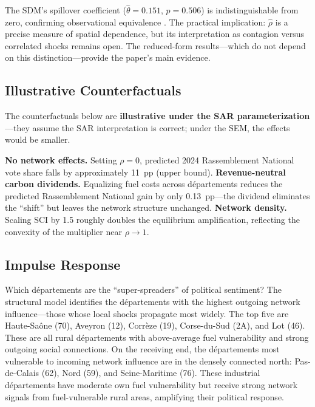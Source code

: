 \documentclass[12pt]{article}
\newcommand{\rn}{Rassemblement National}
\newcommand{\depts}{d\'{e}partements}
\begin{document}
The SDM's spillover coefficient ($\hat{\theta} = 0.151$, $p = 0.506$) is indistinguishable from zero, confirming observational equivalence \citep{lesage2009introduction}. The practical implication: $\hat{\rho}$ is a precise measure of spatial dependence, but its interpretation as contagion versus correlated shocks remains open. The reduced-form results---which do not depend on this distinction---provide the paper's main evidence.

\subsection{Illustrative Counterfactuals}

The counterfactuals below are \textbf{illustrative under the SAR parameterization}---they assume the SAR interpretation is correct; under the SEM, the effects would be smaller.

\textbf{No network effects.} Setting $\rho = 0$, predicted 2024 \rn{} vote share falls by approximately 11~pp (upper bound). \textbf{Revenue-neutral carbon dividends.} Equalizing fuel costs across \depts{} reduces the predicted \rn{} gain by only 0.13~pp---the dividend eliminates the ``shift'' but leaves the network structure unchanged. \textbf{Network density.} Scaling SCI by 1.5 roughly doubles the equilibrium amplification, reflecting the convexity of the multiplier near $\rho \to 1$.

\subsection{Impulse Response}

Which \depts{} are the ``super-spreaders'' of political sentiment? The structural model identifies the \depts{} with the highest outgoing network influence---those whose local shocks propagate most widely. The top five are Haute-Sa\^{o}ne (70), Aveyron (12), Corr\`{e}ze (19), Corse-du-Sud (2A), and Lot (46). These are all rural \depts{} with above-average fuel vulnerability and strong outgoing social connections. On the receiving end, the \depts{} most vulnerable to incoming network influence are in the densely connected north: Pas-de-Calais (62), Nord (59), and Seine-Maritime (76). These industrial \depts{} have moderate own fuel vulnerability but receive strong network signals from fuel-vulnerable rural areas, amplifying their political response.


\end{document}
